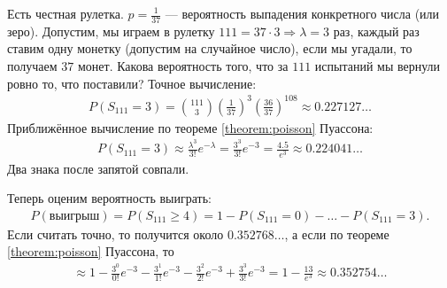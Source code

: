 \begin{exmpl*}
 Есть честная рулетка. $p = \frac{1}{37}$ --- вероятность выпадения конкретного числа (или зеро). Допустим, мы играем в рулетку $111=37\cdot3 \Rightarrow \lambda = 3$ раз, каждый раз ставим одну монетку (допустим на случайное число), если мы угадали, то получаем $37$ монет. Какова вероятность того, что за $111$ испытаний мы вернули ровно то, что поставили? Точное вычисление:
 \begin{align*}
  P(S_{111} = 3) = \binom {111} 3 \left( \frac{1}{37} \right)^{3} \left( \frac{36}{37} \right)^{108} \approx 0.227127\ldots
 \end{align*} Приближённое вычисление по теореме \ref{theorem:poisson} Пуассона:
 \begin{align*}
  P(S_{111} = 3) \approx \frac{\lambda^{3}}{3!}e^{-\lambda} = \frac{3^{3}}{3!} e^{-3} = \frac{4.5}{e^{3}} \approx 0.224041\ldots
 \end{align*} Два знака после запятой совпали.

 Теперь оценим вероятность выиграть:
 \begin{align*}
  P(\text{выигрыш}) = P(S_{111} \geqslant 4) = 1 - P(S_{111} = 0) - \ldots - P(S_{111} = 3)
 .\end{align*} Если считать точно, то получится около $0.352768\ldots$, а если по теореме \ref{theorem:poisson} Пуассона, то
 \begin{align*}
  \approx 1 - \frac{3^{0}}{0!}e^{-3} - \frac{3^{1}}{1!}e^{-3} - \frac{3^{2}}{2!}e^{-3} + \frac{3^{3}}{3!}e^{-3} = 1 - \frac{13}{e^{3}} \approx 0.352754\ldots
 \end{align*} 
\end{exmpl*}


